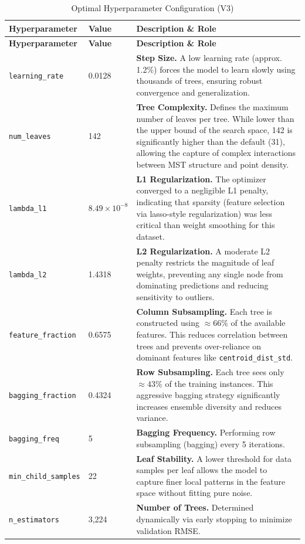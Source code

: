 \documentclass{article}
\begin{document}
\begin{longtable}{p{3.5cm} p{2cm} p{9cm}}
\caption{Optimal Hyperparameter Configuration (V3)} \label{tab:hyperparams} \\
\toprule
\textbf{Hyperparameter} & \textbf{Value} & \textbf{Description \& Role} \\
\midrule
\endfirsthead

\toprule
\textbf{Hyperparameter} & \textbf{Value} & \textbf{Description \& Role} \\
\midrule
\endhead

\texttt{learning\_rate} & 0.0128 & \textbf{Step Size.} A low learning rate (approx. 1.2\%) forces the model to learn slowly using thousands of trees, ensuring robust convergence and generalization. \\
\texttt{num\_leaves} & 142 & \textbf{Tree Complexity.} Defines the maximum number of leaves per tree. While lower than the upper bound of the search space, 142 is significantly higher than the default (31), allowing the capture of complex interactions between MST structure and point density. \\
\texttt{lambda\_l1} & $8.49 \times 10^{-8}$ & \textbf{L1 Regularization.} The optimizer converged to a negligible L1 penalty, indicating that sparsity (feature selection via lasso-style regularization) was less critical than weight smoothing for this dataset. \\
\texttt{lambda\_l2} & 1.4318 & \textbf{L2 Regularization.} A moderate L2 penalty restricts the magnitude of leaf weights, preventing any single node from dominating predictions and reducing sensitivity to outliers. \\
\texttt{feature\_fraction} & 0.6575 & \textbf{Column Subsampling.} Each tree is constructed using $\approx 66\%$ of the available features. This reduces correlation between trees and prevents over-reliance on dominant features like \texttt{centroid\_dist\_std}. \\
\texttt{bagging\_fraction} & 0.4324 & \textbf{Row Subsampling.} Each tree sees only $\approx 43\%$ of the training instances. This aggressive bagging strategy significantly increases ensemble diversity and reduces variance. \\
\texttt{bagging\_freq} & 5 & \textbf{Bagging Frequency.} Performing row subsampling (bagging) every 5 iterations. \\
\texttt{min\_child\_samples} & 22 & \textbf{Leaf Stability.} A lower threshold for data samples per leaf allows the model to capture finer local patterns in the feature space without fitting pure noise. \\
\texttt{n\_estimators} & 3,224 & \textbf{Number of Trees.} Determined dynamically via early stopping to minimize validation RMSE. \\
\bottomrule
\end{longtable}
\end{document}
